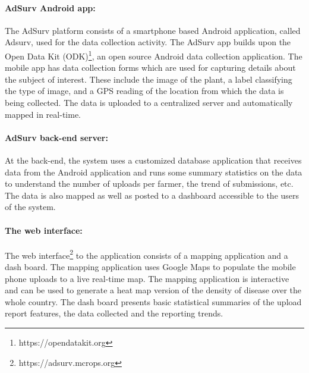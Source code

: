 \documentclass[letterpaper]{article} %
\begin{document}
\paragraph{AdSurv Android app:}
The AdSurv platform consists of a smartphone based Android application, called Adsurv, used for the data collection activity. The AdSurv app builds upon the Open Data Kit (ODK)\footnote{https://opendatakit.org}, an open source Android data collection application. The mobile app has data collection forms which are used for capturing details about the subject of interest. These include the image of the plant, a label classifying the type of image, and a GPS reading of the location from which the data is being collected. The data is uploaded to a centralized server and automatically mapped in real-time.

\paragraph{AdSurv back-end server:}
At the back-end, the system uses a customized database application that receives data from the Android application and runs some summary statistics on the data to understand the number of uploads per farmer, the trend of submissions, etc. The data is also mapped as well as posted to a dashboard accessible to the users of the system.

\paragraph{The web interface: }
The web interface\footnote{https://adsurv.mcrops.org} to the application consists of a mapping application and a dash board. The mapping application uses Google Maps to populate the mobile phone uploads to a live real-time map. The mapping application is interactive and can be used to generate a heat map version of the density of disease over the whole country. The dash board presents basic statistical summaries of the upload report features, the data collected and the reporting trends.
\end{document}
